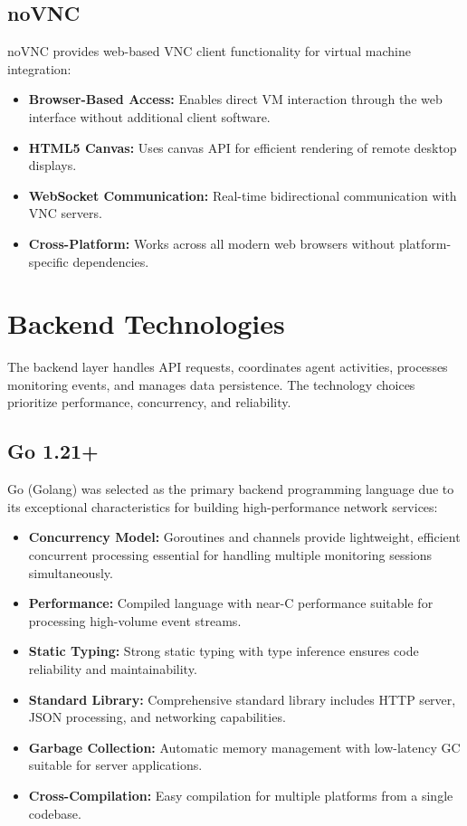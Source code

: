 \subsection{noVNC}

noVNC provides web-based VNC client functionality for virtual machine integration:

\begin{itemize}
    \item \textbf{Browser-Based Access:} Enables direct VM interaction through the web interface without additional client software.
    \item \textbf{HTML5 Canvas:} Uses canvas API for efficient rendering of remote desktop displays.
    \item \textbf{WebSocket Communication:} Real-time bidirectional communication with VNC servers.
    \item \textbf{Cross-Platform:} Works across all modern web browsers without platform-specific dependencies.
\end{itemize}

\section{Backend Technologies}

The backend layer handles API requests, coordinates agent activities, processes monitoring events, and manages data persistence. The technology choices prioritize performance, concurrency, and reliability.

\subsection{Go 1.21+}

Go (Golang) was selected as the primary backend programming language due to its exceptional characteristics for building high-performance network services:

\begin{itemize}
    \item \textbf{Concurrency Model:} Goroutines and channels provide lightweight, efficient concurrent processing essential for handling multiple monitoring sessions simultaneously.
    \item \textbf{Performance:} Compiled language with near-C performance suitable for processing high-volume event streams.
    \item \textbf{Static Typing:} Strong static typing with type inference ensures code reliability and maintainability.
    \item \textbf{Standard Library:} Comprehensive standard library includes HTTP server, JSON processing, and networking capabilities.
    \item \textbf{Garbage Collection:} Automatic memory management with low-latency GC suitable for server applications.
    \item \textbf{Cross-Compilation:} Easy compilation for multiple platforms from a single codebase.
\end{itemize}

